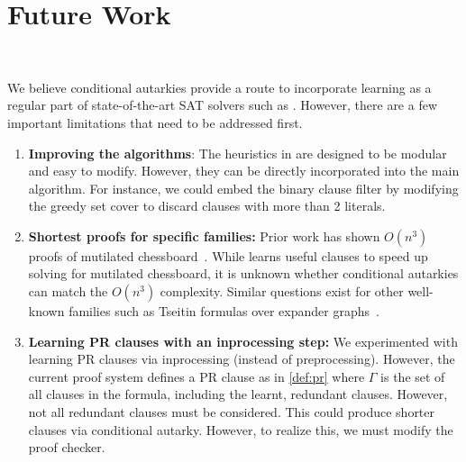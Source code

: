 \section{Future Work}~\label{sec:futurework}

We believe conditional autarkies provide a route to incorporate \pr learning
as a regular part of state-of-the-art SAT solvers such as \cadical. However,
there are a few important limitations that need to be addressed first.

\begin{enumerate}
    \item \textbf{Improving the algorithms}: The heuristics in \tool are
    designed to be modular and easy to modify. However, they can
    be directly incorporated into the main algorithm. For instance, we could embed the
    binary clause filter by modifying the greedy set cover to discard clauses
    with more than 2 literals.
    \item \textbf{Shortest proofs for specific families:} Prior work has shown
    $O(n^3)$ \pr proofs of mutilated chessboard~\cite{mutilatedchessboard-pr}.
    While \tool learns useful clauses to speed up solving for
    mutilated chessboard, it is unknown whether conditional autarkies can match
    the $O(n^3)$ complexity. Similar questions exist for other well-known
    families such as Tseitin formulas over expander
    graphs~\cite{er,hardexamplesresolution}.
    \item \textbf{Learning PR clauses with an inprocessing step:} We
    experimented with learning PR clauses via inprocessing (instead of
    preprocessing). However, the current \pr proof system defines a PR clause
    as in \autoref{def:pr} where $\Gamma$ is the set of all clauses in the
    formula, including the learnt, redundant clauses. However, not all redundant clauses 
    must be considered. This could produce shorter clauses via conditional autarky.
    However, to realize this, we must modify the \pr proof checker.
\end{enumerate}